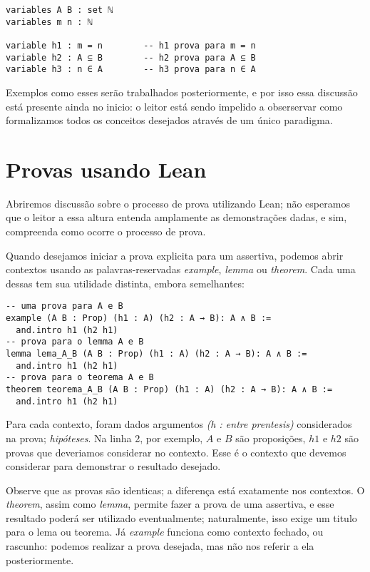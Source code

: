 \vspace{5mm}
\begin{lstlisting}
variables A B : set ℕ
variables m n : ℕ

variable h1 : m = n        -- h1 prova para m = n
variable h2 : A ⊆ B        -- h2 prova para A ⊆ B
variable h3 : n ∈ A        -- h3 prova para n ∈ A
\end{lstlisting}
\vspace{5mm}

Exemplos como esses serão trabalhados posteriormente, e por isso essa discussão está presente ainda no inicio: o leitor está sendo impelido a obserservar como formalizamos todos os conceitos desejados através de um único paradigma.

\section{Provas usando Lean}
Abriremos discussão sobre o processo de prova utilizando Lean; não esperamos que o leitor a essa altura entenda amplamente as demonstrações dadas, e sim, compreenda como ocorre o processo de prova.

Quando desejamos iniciar a prova explicita para um assertiva, podemos abrir contextos usando as palavras-reservadas \textit{example}, \textit{lemma} ou \textit{theorem}. Cada uma dessas tem sua utilidade distinta, embora semelhantes:

\vspace{5mm}
\begin{lstlisting}
-- uma prova para A e B
example (A B : Prop) (h1 : A) (h2 : A → B): A ∧ B :=
  and.intro h1 (h2 h1)
-- prova para o lemma A e B
lemma lema_A_B (A B : Prop) (h1 : A) (h2 : A → B): A ∧ B :=
  and.intro h1 (h2 h1)
-- prova para o teorema A e B
theorem teorema_A_B (A B : Prop) (h1 : A) (h2 : A → B): A ∧ B :=
  and.intro h1 (h2 h1)
\end{lstlisting}
\vspace{5mm}

\noindent Para cada contexto, foram dados argumentos \textit{(h : entre prentesis)} considerados na prova; \textit{hipóteses}. Na linha 2, por exemplo, $A$ e $B$ são proposições, $h1$ e $h2$ são provas que deveriamos considerar no contexto. Esse é o contexto que devemos considerar para demonstrar o resultado desejado.

Observe que as provas são identicas; a diferença está exatamente nos contextos. O \textit{theorem}, assim como \textit{lemma}, permite fazer a prova de uma assertiva, e esse resultado poderá ser utilizado eventualmente; naturalmente, isso exige um titulo para o lema ou teorema.
Já \textit{example} funciona como contexto fechado, ou rascunho: podemos realizar a prova desejada, mas não nos referir a ela posteriormente.

